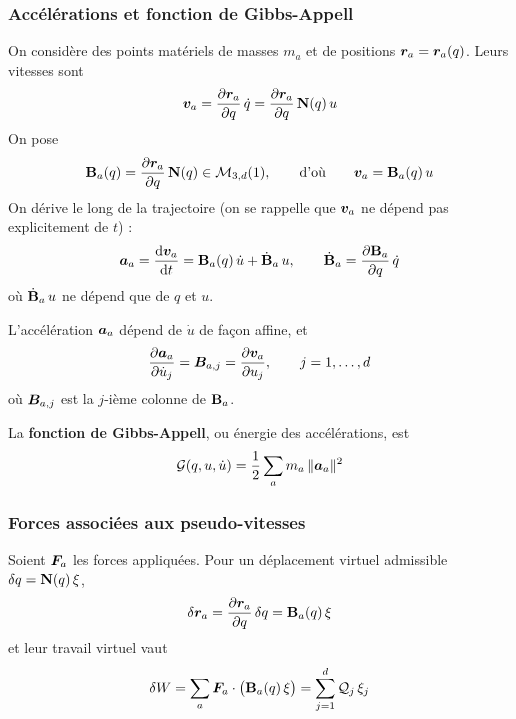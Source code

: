 \subsubsection{Accélérations et fonction de Gibbs-Appell}

On considère des points matériels de masses $m_a$ et de positions
$\bm{r}_a = \bm{r}_a(q)$. Leurs vitesses sont
\[
    \bm{v}_a = \frac{\partial\bm{r}_a}{\partial q}\,\dot q
    = \frac{\partial\bm{r}_a}{\partial q}\,\mathbf{N}(q)\,u
\]
On pose
\[
    \mathbf{B}_a(q) = \frac{\partial\bm{r}_a}{\partial q}\,\mathbf{N}(q)
    \in\mathcal{M}_{3,d}(1),
    \qquad\text{d'où}\qquad
    \bm{v}_a = \mathbf{B}_a(q)\,u
\]
On dérive le long de la trajectoire (on se rappelle que $\bm{v}_a$ ne dépend pas explicitement de $t$) :
\[
    \bm{a}_a = \frac{\mathrm{d}\bm{v}_a}{\mathrm{d}t}
    = \mathbf{B}_a(q)\,\dot u + \dot{\mathbf{B}}_a\,u,
    \qquad
    \dot{\mathbf{B}}_a = \frac{\partial\mathbf{B}_a}{\partial q}\,\dot q
\]
où $\dot{\mathbf{B}}_a\,u$ ne dépend que de $q$ et $u$.

\begin{proposition}[Accélérations]
    L'accélération $\bm{a}_a$ dépend de $\dot u$ de façon affine, et
    \[
        \frac{\partial\bm{a}_a}{\partial\dot u_j}
        = \bm{B}_{a,j}
        = \frac{\partial\bm{v}_a}{\partial u_j},
        \qquad j = 1,\dots,d
    \]
    où $\bm{B}_{a,j}$ est la $j$-ième colonne de $\mathbf{B}_a$.
\end{proposition}

\begin{definition}
    La \textbf{fonction de Gibbs-Appell}, ou énergie des
    accélérations, est
    \[
        \mathcal{G}(q, u, \dot u)
        = \frac{1}{2}\sum_a m_a\,\|\bm{a}_a\|^2
    \]
\end{definition}

\subsubsection{Forces associées aux pseudo-vitesses}

Soient $\bm{F}_a$ les forces appliquées. Pour un déplacement virtuel
admissible $\delta q = \mathbf{N}(q)\,\xi$,
\[
    \delta\bm{r}_a = \frac{\partial \bm{r}_a}{\partial q}\,\delta q
    = \mathbf{B}_a(q)\,\xi
\]
et leur travail virtuel vaut
\[
    \delta W = \sum_a\bm{F}_a\cdot\bigl(\mathbf{B}_a(q)\,\xi\bigr)
    = \sum_{j=1}^{d}\mathcal{Q}_j\,\xi_j
\]

